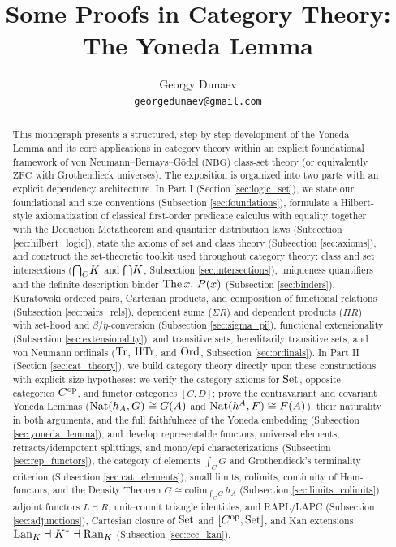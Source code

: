 \documentclass[10pt,a4paper]{article}
\title{Some Proofs in Category Theory: The Yoneda Lemma}
\author{Georgy Dunaev \\ \texttt{georgedunaev@gmail.com}}
\date{}
\begin{document}
\maketitle

\begin{abstract}
This monograph presents a structured, step-by-step development of the Yoneda Lemma and its core applications in category theory within an explicit foundational framework of von Neumann--Bernays--G\"odel ($\mathrm{NBG}$) class-set theory (or equivalently $\mathrm{ZFC}$ with Grothendieck universes). The exposition is organized into two parts with an explicit dependency architecture. In Part I (Section \ref{sec:logic_set}), we state our foundational and size conventions (Subsection \ref{sec:foundations}), formulate a Hilbert-style axiomatization of classical first-order predicate calculus with equality together with the Deduction Metatheorem and quantifier distribution laws (Subsection \ref{sec:hilbert_logic}), state the axioms of set and class theory (Subsection \ref{sec:axioms}), and construct the set-theoretic toolkit used throughout category theory: class and set intersections (${{\bigcap}_C} K$ and ${\bigcap} K$, Subsection \ref{sec:intersections}), uniqueness quantifiers and the definite description binder ${\textrm{The\,}} x.\ P(x)$ (Subsection \ref{sec:binders}), Kuratowski ordered pairs, Cartesian products, and composition of functional relations (Subsection \ref{sec:pairs_rels}), dependent sums ($\Sigma R$) and dependent products ($\Pi R$) with set-hood and $\beta/\eta$-conversion (Subsection \ref{sec:sigma_pi}), functional extensionality (Subsection \ref{sec:extensionality}), and transitive sets, hereditarily transitive sets, and von Neumann ordinals (${\textrm{Tr}}$, ${\textrm{HTr}}$, and ${\textrm{Ord}}$, Subsection \ref{sec:ordinals}). In Part II (Section \ref{sec:cat_theory}), we build category theory directly upon these constructions with explicit size hypotheses: we verify the category axioms for ${\textrm{Set}}$, opposite categories $C^{\textrm{op}}$, and functor categories $[C, D]$; prove the contravariant and covariant Yoneda Lemmas (${\textrm{Nat}}(h_A, G) \cong G(A)$ and ${\textrm{Nat}}(h^A, F) \cong F(A)$), their naturality in both arguments, and the full faithfulness of the Yoneda embedding (Subsection \ref{sec:yoneda_lemma}); and develop representable functors, universal elements, retracts/idempotent splittings, and mono/epi characterizations (Subsection \ref{sec:rep_functors}), the category of elements $\int_C G$ and Grothendieck's terminality criterion (Subsection \ref{sec:cat_elements}), small limits, colimits, continuity of Hom-functors, and the Density Theorem $G \cong \mathrm{colim}_{\int_C G}\, h_A$ (Subsection \ref{sec:limits_colimits}), adjoint functors $L \dashv R$, unit--counit triangle identities, and RAPL/LAPC (Subsection \ref{sec:adjunctions}), Cartesian closure of ${\textrm{Set}}$ and $[C^{\textrm{op}}, {\textrm{Set}}]$, and Kan extensions ${\mathrm{Lan}}_K \dashv K^* \dashv {\mathrm{Ran}}_K$ (Subsection \ref{sec:ccc_kan}).
\end{abstract}
\end{document}
